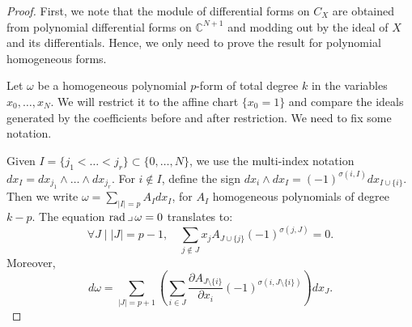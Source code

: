 \documentclass[a4paper, 11pt]{amsart}
\newcommand{\CC}{\mathbb{C}}
\theoremstyle{plain}
\numberwithin{theorem}{section}
\theoremstyle{definition}
\DeclareMathOperator{\cont}{\lrcorner}
\newcommand{\op}[1]{{\mathcal O}_{\mathbb{P}^{#1}}}
\newcommand{\p}[1]{{\mathbb{P}^{#1}}}
\newcommand{\rad}{ {\rm rad}}
\begin{document}
\begin{proof}

First, we note that the module of differential forms on $C_X$ are obtained from polynomial differential forms on $\CC^{N+1}$ and modding out by the ideal of $X$ and its differentials. Hence, we only need to prove the result for polynomial homogeneous forms.

Let $\omega$ be a homogeneous polynomial $p$-form of total degree $k$ in the variables $x_0, \dots, x_N$. We will restrict it to the affine chart $\{x_0 = 1\}$ and compare the ideals generated by the coefficients before and after restriction. We need to fix some notation.

Given $I = \{j_1 < \dots < j_r \} \subset \{0, \dots, N\}$, we use the multi-index notation $dx_I = dx_{j_1}\wedge \dots \wedge dx_{j_r}$. For $i\not\in I$, define the sign $dx_i \wedge dx_I = (-1)^{\sigma(i,I)} dx_{I\cup \{i\}}$. Then we write $\omega = \sum_{|I| = p} A_Idx_I$, for $A_I$ homogeneous polynomials of degree $k-p$. The equation $\rad \cont \omega = 0$ translates to: 
\begin{equation}\label{eq:euler-relation}
    \forall J \mid |J| = p-1, \quad \sum_{j\not\in  J} x_j A_{J\cup \{j\}}(-1)^{\sigma(j,J)} = 0.
\end{equation}
Moreover,
\begin{equation}
    d\omega = \sum_{|J| = p+1} \left(\sum_{i\in J} \frac{\partial A_{J\setminus \{i\} }}{\partial x_i} (-1)^{\sigma(i,J\setminus \{i\})} \right) dx_J. 
\end{equation}


\end{proof}
\end{document}

